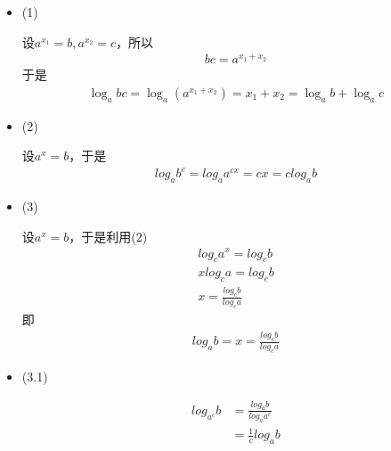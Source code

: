 \documentclass{article}
\begin{document}
\begin{itemize}
  \item (1)

        设$a^{x_1} = b, a^{x_2} = c$，所以
        \begin{align*}
          b c = a^{x_1 + x_2}
        \end{align*}
        于是
        \begin{align*}
          \log_a b c = \log_a (a^{x_1 + x_2}) = x_1 + x_2 = \log_a b + \log_a c
        \end{align*}

  \item (2)

        设$a^x = b$，于是
        \begin{align*}
          log_a b^c = log_a a^{cx} = cx = c log_a b
        \end{align*}

  \item (3)

        设$a^x = b$，于是利用(2)
        \begin{align*}
          log_c a^x = log_c b \\
          x log_c a = log_c b \\
          x = \frac{log_c b}{log_c a}
        \end{align*}
        即
        \begin{align*}
          log_a b = x = \frac{log_c b}{log_c a}
        \end{align*}

  \item (3.1)

        \begin{align*}
          log_{a^c} b & = \frac{log_a b}{log_a a^c} \\
                      & = \frac{1}{c} log_a b
        \end{align*}

\end{itemize}
\end{document}
